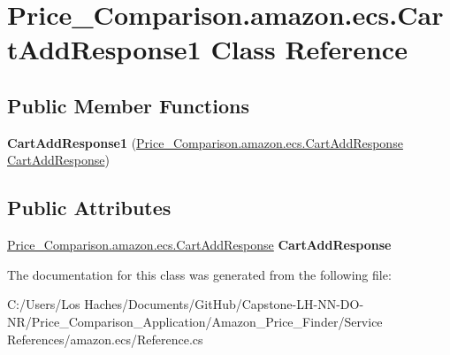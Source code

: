 \hypertarget{class_price___comparison_1_1amazon_1_1ecs_1_1_cart_add_response1}{\section{Price\-\_\-\-Comparison.\-amazon.\-ecs.\-Cart\-Add\-Response1 Class Reference}
\label{class_price___comparison_1_1amazon_1_1ecs_1_1_cart_add_response1}
}
\subsection*{Public Member Functions}
\begin{DoxyCompactItemize}
\item 
\hypertarget{class_price___comparison_1_1amazon_1_1ecs_1_1_cart_add_response1_a89747a82f0ba8377b1406c0aa1fd9c5e}{{\bfseries Cart\-Add\-Response1} (\hyperlink{class_price___comparison_1_1amazon_1_1ecs_1_1_cart_add_response}{Price\-\_\-\-Comparison.\-amazon.\-ecs.\-Cart\-Add\-Response} \hyperlink{class_price___comparison_1_1amazon_1_1ecs_1_1_cart_add_response}{Cart\-Add\-Response})}\label{class_price___comparison_1_1amazon_1_1ecs_1_1_cart_add_response1_a89747a82f0ba8377b1406c0aa1fd9c5e}

\end{DoxyCompactItemize}
\subsection*{Public Attributes}
\begin{DoxyCompactItemize}
\item 
\hypertarget{class_price___comparison_1_1amazon_1_1ecs_1_1_cart_add_response1_a8ca93d7549a2db767d15ce47ce44200b}{\hyperlink{class_price___comparison_1_1amazon_1_1ecs_1_1_cart_add_response}{Price\-\_\-\-Comparison.\-amazon.\-ecs.\-Cart\-Add\-Response} {\bfseries Cart\-Add\-Response}}\label{class_price___comparison_1_1amazon_1_1ecs_1_1_cart_add_response1_a8ca93d7549a2db767d15ce47ce44200b}

\end{DoxyCompactItemize}


The documentation for this class was generated from the following file\-:\begin{DoxyCompactItemize}
\item 
C\-:/\-Users/\-Los Haches/\-Documents/\-Git\-Hub/\-Capstone-\/\-L\-H-\/\-N\-N-\/\-D\-O-\/\-N\-R/\-Price\-\_\-\-Comparison\-\_\-\-Application/\-Amazon\-\_\-\-Price\-\_\-\-Finder/\-Service References/amazon.\-ecs/Reference.\-cs\end{DoxyCompactItemize}
